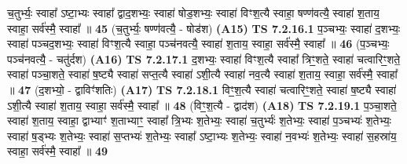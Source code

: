 \documentclass[17pt]{extarticle}
\begin{document}
                  च॒तुर्भ्यः॒ स्वाहा᳚ ऽष्टा॒भ्यः स्वाहा᳚ द्वाद॒शभ्यः॒ स्वाहा॑ षोड॒शभ्यः॒ स्वाहा॑ विꣳश॒त्यै स्वाहा॒ षण्ण॑वत्यै॒ स्वाहा॑ श॒ताय॒ स्वाहा॒ सर्व॑स्मै॒ स्वाहा᳚ ॥ \textbf{  45} \newline
                  \newline
                      (च॒तुर्भ्यः॒ षण्ण॑वत्यै॒ - षोड॑श)  \textbf{(A15)} \newline \newline
                                        \textbf{ TS 7.2.16.1} \newline
                  प॒ञ्चभ्यः॒ स्वाहा॑ द॒शभ्यः॒ स्वाहा॑ पञ्चद॒शभ्यः॒ स्वाहा॑ विꣳश॒त्यै स्वाहा॒ पञ्च॑नवत्यै॒ स्वाहा॑ श॒ताय॒ स्वाहा॒ सर्व॑स्मै॒ स्वाहा᳚ ॥ \textbf{  46} \newline
                  \newline
                      (प॒ञ्चभ्यः॒ पञ्च॑नवत्यै॒ - चतु॑र्दश)  \textbf{(A16)} \newline \newline
                                        \textbf{ TS 7.2.17.1} \newline
                  द॒शभ्यः॒ स्वाहा॑ विꣳश॒त्यै स्वाहा᳚ त्रिꣳ॒॒शते॒ स्वाहा॑ चत्वारिꣳ॒॒शते॒ स्वाहा॑ पञ्चा॒शते॒ स्वाहा॑ ष॒ष्ट्यै स्वाहा॑ सप्त॒त्यै स्वाहा॑ ऽशी॒त्यै स्वाहा॑ नव॒त्यै स्वाहा॑ श॒ताय॒ स्वाहा॒ सर्व॑स्मै॒ स्वाहा᳚ ॥ \textbf{  47} \newline
                  \newline
                      (द॒शभ्यो॒ - द्वाविꣳ॑शतिः)  \textbf{(A17)} \newline \newline
                                        \textbf{ TS 7.2.18.1} \newline
                  विꣳ॒॒श॒त्यै स्वाहा॑ चत्वारिꣳ॒॒शते॒ स्वाहा॑ ष॒ष्ट्यै स्वाहा॑ ऽशी॒त्यै स्वाहा॑ श॒ताय॒ स्वाहा॒ सर्व॑स्मै॒ स्वाहा᳚ ॥ \textbf{  48} \newline
                  \newline
                      (विꣳ॒॒श॒त्यै - द्वाद॑श)  \textbf{(A18)} \newline \newline
                                        \textbf{ TS 7.2.19.1} \newline
                  प॒ञ्चा॒शते॒ स्वाहा॑ श॒ताय॒ स्वाहा॒ द्वाभ्याꣳ॑ श॒ताभ्याꣳ॒॒ स्वाहा᳚ त्रि॒भ्यः श॒तेभ्यः॒ स्वाहा॑ च॒तुर्भ्यः॑ श॒तेभ्यः॒ स्वाहा॑ प॒ञ्चभ्यः॑ श॒तेभ्यः॒ स्वाहा॑ ष॒ड्भ्यः श॒तेभ्यः॒ स्वाहा॑ स॒प्तभ्यः॑ श॒तेभ्यः॒ स्वाहा᳚ ऽष्टा॒भ्यः श॒तेभ्यः॒ स्वाहा॑ न॒वभ्यः॑ श॒तेभ्यः॒ स्वाहा॑ स॒हस्रा॑य॒ स्वाहा॒ सर्व॑स्मै॒ स्वाहा᳚ ॥ \textbf{  49 } \newline
\end{document}
